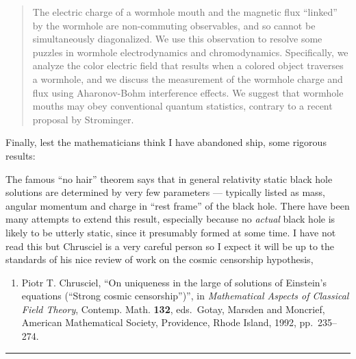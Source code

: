 \documentclass[12pt]{article}
\def\tightlist{}
\renewcommand{\texttt}[1]{%
  \begingroup
  \ttfamily
  \begingroup\lccode`~=`/\lowercase{\endgroup\def~}{/\discretionary{}{}{}}%
  \begingroup\lccode`~=`[\lowercase{\endgroup\def~}{[\discretionary{}{}{}}%
  \begingroup\lccode`~=`.\lowercase{\endgroup\def~}{.\discretionary{}{}{}}%
  \catcode`/=\active\catcode`[=\active\catcode`.=\active
  \scantokens{#1\noexpand}%
  \endgroup
}
\begin{document}
\begin{quote}
The electric charge of a wormhole mouth and the magnetic flux ``linked''
by the wormhole are non-commuting observables, and so cannot be
simultaneously diagonalized. We use this observation to resolve some
puzzles in wormhole electrodynamics and chromodynamics. Specifically, we
analyze the color electric field that results when a colored object
traverses a wormhole, and we discuss the measurement of the wormhole
charge and flux using Aharonov-Bohm interference effects. We suggest
that wormhole mouths may obey conventional quantum statistics, contrary
to a recent proposal by Strominger.
\end{quote}

Finally, lest the mathematicians think I have abandoned ship, some
rigorous results:

\noindent
The famous ``no hair'' theorem says that in general relativity static
black hole solutions are determined by very few parameters --- typically
listed as mass, angular momentum and charge in ``rest frame'' of the
black hole. There have been many attempts to extend this result,
especially because no \emph{actual} black hole is likely to be utterly
static, since it presumably formed at some time. I have not read this
but Chrusciel is a very careful person so I expect it will be up to the
standards of his nice review of work on the cosmic censorship
hypothesis,

\begin{enumerate}
\def\labelenumi{\arabic{enumi})}
\setcounter{enumi}{8}
\tightlist
\item
  Piotr T. Chrusciel, ``On uniqueness in the large of solutions of Einstein's equations
  (``Strong cosmic censorship'')'', in
  \emph{Mathematical Aspects of Classical Field Theory}, Contemp. Math.
  \textbf{132}, eds.~Gotay, Marsden and Moncrief, American Mathematical
  Society, Providence, Rhode Island,
  1992, pp.~235--274.
\end{enumerate}

\begin{center}\rule{0.5\linewidth}{0.5pt}\end{center}
\end{document}
